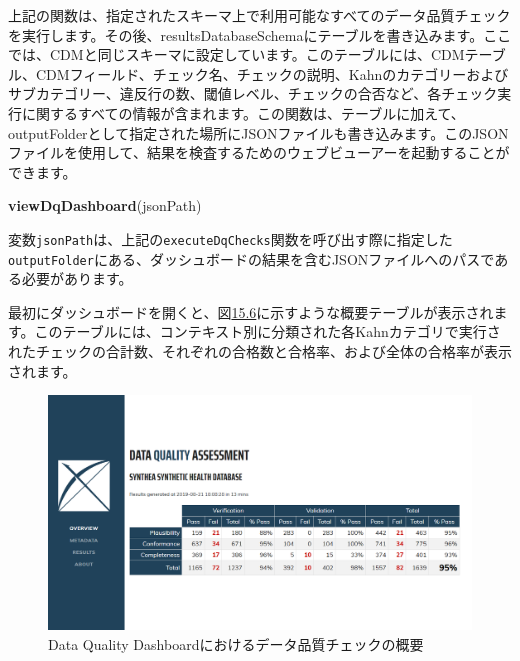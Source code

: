 \documentclass[
  11pt]{book}
\newenvironment{Shaded}{\begin{snugshade}}{\end{snugshade}}
\newcommand{\FunctionTok}[1]{\textcolor[rgb]{0.13,0.29,0.53}{\textbf{#1}}}
\newcommand{\NormalTok}[1]{#1}
\theoremstyle{definition}
\theoremstyle{definition}
\theoremstyle{definition}
\theoremstyle{definition}
\theoremstyle{remark}
\begin{document}
上記の関数は、指定されたスキーマ上で利用可能なすべてのデータ品質チェックを実行します。その後、resultsDatabaseSchemaにテーブルを書き込みます。ここでは、CDMと同じスキーマに設定しています。このテーブルには、CDMテーブル、CDMフィールド、チェック名、チェックの説明、Kahnのカテゴリーおよびサブカテゴリー、違反行の数、閾値レベル、チェックの合否など、各チェック実行に関するすべての情報が含まれます。この関数は、テーブルに加えて、outputFolderとして指定された場所にJSONファイルも書き込みます。このJSONファイルを使用して、結果を検査するためのウェブビューアーを起動することができます。

\begin{Shaded}
\begin{Highlighting}[]
\FunctionTok{viewDqDashboard}\NormalTok{(jsonPath)}
\end{Highlighting}
\end{Shaded}

変数\texttt{jsonPath}は、上記の\texttt{executeDqChecks}関数を呼び出す際に指定した\texttt{outputFolder}にある、ダッシュボードの結果を含むJSONファイルへのパスである必要があります。

最初にダッシュボードを開くと、図\href{https://ohdsi.github.io/TheBookOfOhdsi/DataQuality.html\#fig:dqdOverview}{15.6}に示すような概要テーブルが表示されます。このテーブルには、コンテキスト別に分類された各Kahnカテゴリで実行されたチェックの合計数、それぞれの合格数と合格率、および全体の合格率が表示されます。

\begin{figure}

{\centering \includegraphics[width=1\linewidth]{images/DataQuality/dqdOverview} 

}

\caption{Data Quality Dashboardにおけるデータ品質チェックの概要}\label{fig:dqdOverview}
\end{figure}
\end{document}

